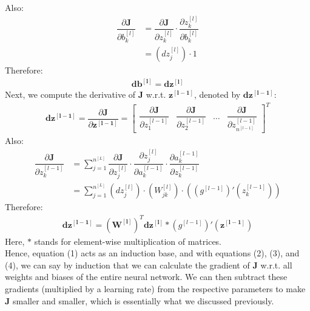 \documentclass[a4paper, 12pt]{article}
\begin{document}
Also:
\begin{align*}
\dfrac{\partial \bm{J}}{\partial b_k^{\left[l\right]}} &= \dfrac{\partial \bm{J}}{\partial z_k^{\left[l\right]}}\cdot\dfrac{\partial z_k^{\left[l\right]}}{\partial b_k^{\left[l\right]}} \\
&= \left(dz_{j}^{\left[l\right]}\right)\cdot 1
\end{align*}
Therefore:
\begin{align}
\bm{db^{\left[l\right]}} = \bm{dz^{\left[l\right]}}
\end{align}
Next, we compute the derivative of $\bm{J}$ w.r.t. $\bm{z^{\left[l-1\right]}}$, denoted by $\bm{dz^{\left[l-1\right]}}$:
\begin{align*}
\bm{dz^{\left[l-1\right]}} = \dfrac{\partial \bm{J}}{\partial \bm{z^{\left[l-1\right]}}} = 
\begin{bmatrix}
\dfrac{\partial \bm{J}}{\partial z_{1}^{\left[l-1\right]}} &
\dfrac{\partial \bm{J}}{\partial z_{2}^{\left[l-1\right]}} &
\dots &
\dfrac{\partial \bm{J}}{\partial z_{n^{[l-1]}}^{\left[l-1\right]}}
\end{bmatrix}^T
\end{align*}
Also:
\begin{align*}
\dfrac{\partial \bm{J}}{\partial z_k^{\left[l-1\right]}} &= \sum_{j=1}^{n^{[L]}}\dfrac{\partial \bm{J}}{\partial z_j^{\left[l\right]}}\cdot\dfrac{\partial z_j^{\left[l\right]}}{\partial a_k^{\left[l-1\right]}}\cdot\dfrac{\partial a_k^{\left[l-1\right]}}{\partial z_k^{\left[l-1\right]}} \\
&= \sum_{j=1}^{n^{[L]}}\left(dz_{j}^{\left[l\right]}\right)\cdot\left(W_{jk}^{\left[l\right]}\right)\cdot\left(\left(g^{[l-1]}\right)'\left(z_k^{\left[l-1\right]}\right)\right)
\end{align*}
Therefore:
\begin{align}
\bm{dz^{\left[l-1\right]}} = \left(\bm{W^{\left[l\right]}}\right)^T\bm{dz^{\left[l\right]}} * \left(g^{[l-1]}\right)'\left(\bm{z^{\left[l-1\right]}}\right)
\end{align}
Here, $*$ stands for element-wise multiplication of matrices. \\
Hence, equation (1) acts as an induction base, and with equations (2), (3), and (4), we can say by induction that we can calculate the gradient of $\bm{J}$ w.r.t. all weights and biases of the entire neural network. We can then subtract these gradients (multiplied by a learning rate) from the respective parameters to make $\bm{J}$ smaller and smaller, which is essentially what we discussed previously.
\end{document}
